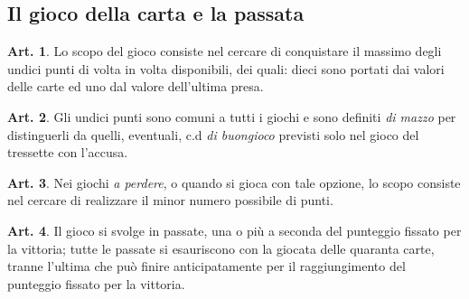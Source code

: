 \documentclass[italian,a4paper]{article}
\theoremstyle{definition}
\newtheorem{art}{Art.}
\begin{document}
\subsection{Il gioco della carta e la passata}
\begin{art}
    Lo scopo del gioco consiste nel cercare di conquistare il massimo degli undici punti di volta in volta disponibili, dei quali: dieci sono  portati dai valori delle carte ed uno dal valore dell'ultima presa.
\end{art}
\begin{art}
    Gli undici punti sono comuni a tutti i giochi e sono definiti \emph{di
    mazzo} per distinguerli da quelli, eventuali, c.d \emph{di buongioco} previsti solo nel gioco del tressette con l'accusa.
\end{art}
\begin{art}
    Nei giochi \emph{a perdere}, o quando si gioca con tale opzione, lo scopo consiste nel cercare di realizzare il minor numero possibile di punti.
\end{art}
\begin{art}
    Il gioco si svolge in passate, una o più a seconda del punteggio fissato per la vittoria; tutte le passate si esauriscono con la giocata delle quaranta carte, tranne l'ultima che può finire anticipatamente per il raggiungimento del punteggio fissato per la vittoria.
\end{art}
\end{document}
